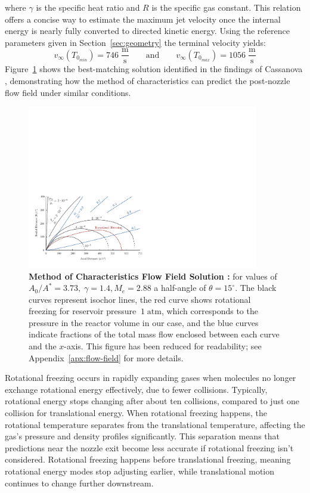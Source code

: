 		where $\gamma$ is the specific heat ratio and $R$ is the specific gas constant. This relation offers a concise way to estimate the maximum jet velocity once the internal energy is nearly fully converted to directed kinetic energy.
		Using the reference parameters given in Section~\ref{sec:geometry} the terminal velocity yields:
		$$
			v_\infty(T_{0_{min}}) = 746 \; \frac{\text{m}}{\text{s}}
				\qquad \text{and} \qquad
			v_\infty(T_{0_{max}}) = 1056 \; \frac{\text{m}}{\text{s}}
		$$
		\newpage
		Figure~\ref{fig:velocity-distribution-reduced} shows the best-matching solution identified in the findings of Cassanova \cite{Cassanova1965}, demonstrating how the method of characteristics can predict the post-nozzle flow field under similar conditions.
		\begin{figure}[H]
			\centering
		    \includegraphics[width=0.9\textwidth]{src/03_analytical-work/fig_velocity-distribution-reduced.pdf}
			\caption[Method of Characteristics Flow Field Solution \cite{Cassanova1965}]{
				\textbf{Method of Characteristics Flow Field Solution \cite{Cassanova1965}:}
				for values of $A_0/A^* = 3.73,\;\gamma=1.4,M_e =2.88$ a half-angle of $\theta = 15^\circ$.
				The black curves represent isochor lines, the red curve shows rotational freezing for reservoir pressure $~1\;\text{atm}$, which corresponds to the pressure in the reactor volume in our case, and the blue curves indicate fractions of the total mass flow enclosed between each curve and the $x$-axis. 
				This figure has been reduced for readability; see Appendix~\ref{apx:flow-field} for more details.
			}
			\label{fig:velocity-distribution-reduced}
		\end{figure}

		Rotational freezing occurs in rapidly expanding gases when molecules no longer exchange rotational energy effectively, due to fewer collisions.
		Typically, rotational energy stops changing after about ten collisions, compared to just one collision for translational energy.
		When rotational freezing happens, the rotational temperature separates from the translational temperature, affecting the gas's pressure and density profiles significantly.
		This separation means that predictions near the nozzle exit become less accurate if rotational freezing isn't considered.
		Rotational freezing happens before translational freezing, meaning rotational energy modes stop adjusting earlier, while translational motion continues to change further downstream.

